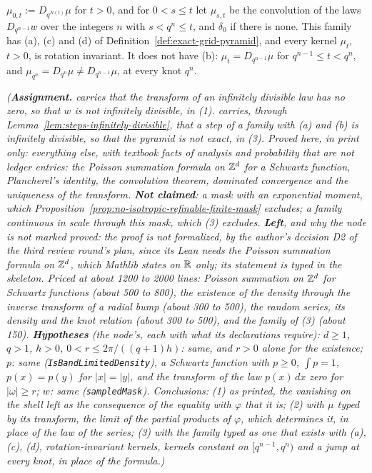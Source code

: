 \begin{proposition}
\begin{enumerate}
$\mu_{0,t} := D_{q^{N(t)}}\mu$ for $t > 0$, and for $0 < s \le t$ let $\mu_{s,t}$ be the
convolution of the laws $D_{q^{n-1}}w$ over the integers $n$ with $s < q^n \le t$, and $\delta_0$
if there is none. This family has (a), (c) and (d) of Definition~\ref{def:exact-grid-pyramid}, and
every kernel $\mu_t$, $t > 0$,
is rotation invariant. It does not have (b): $\mu_t = D_{q^{n-1}}\mu$ for
$q^{n-1} \le t < q^n$, and $\mu_{q^n} = D_{q^n}\mu \ne D_{q^{n-1}}\mu$, at every knot $q^n$.
\end{enumerate}
\statusA\quad{}\quad{}\quad\emph{(\textbf{Assignment.}  carries
that the transform of an infinitely divisible law has no zero, so that $w$ is not infinitely
divisible, in (1).  carries, through Lemma~\ref{lem:steps-infinitely-divisible}, that a
step of a family with (a) and (b) is infinitely divisible, so that the pyramid is not exact, in (3).
Proved here, in print only: everything else, with textbook facts of analysis and probability that
are not ledger entries: the Poisson summation formula on $\mathbb{Z}^d$ for a Schwartz function,
Plancherel's identity, the convolution theorem, dominated convergence and the uniqueness of the
transform. \textbf{Not claimed}: a mask with an exponential moment, which
Proposition~\ref{prop:no-isotropic-refinable-finite-mask} excludes; a family continuous in scale
through this mask, which (3) excludes. \textbf{Left}, and why the node is not marked proved: the
proof is not formalized, by the author's decision D2 of the third review round's plan, since its
Lean needs the Poisson summation formula on $\mathbb{Z}^d$, which Mathlib states on $\mathbb{R}$ only; its
statement is typed in the skeleton. Priced at about 1200 to 2000 lines: Poisson summation on
$\mathbb{Z}^d$ for Schwartz functions (about 500 to 800), the existence of the density through the inverse
transform of a radial bump (about 300 to 500), the random series, its density and the knot relation
(about 300 to 500), and the family of (3) (about 150). \textbf{Hypotheses} (the node's, each with
what its declarations require): $d \ge 1$, $q > 1$, $h > 0$, $0 < r \le 2\pi/((q+1)h)$: same, and
$r > 0$ alone for the existence; $p$: same (\texttt{IsBandLimitedDensity}), a Schwartz function with
$p \ge 0$, $\int p = 1$, $p(x) = p(y)$ for $|x| = |y|$, and the transform of the law $p(x)\,dx$ zero
for $|\omega| \ge r$; $w$: same (\texttt{sampledMask}). Conclusions: (1) as printed, the vanishing on
the shell left as the consequence of the equality with $\varphi$ that it is; (2) with $\mu$ typed by
its transform, the limit of the partial products of $\varphi$, which determines it, in place of
the law of the series; (3) with the family typed as one that exists with (a), (c), (d), rotation-invariant
kernels, kernels constant on $[q^{n-1}, q^n)$ and a jump at every knot, in place of the formula.)}
\end{proposition}

